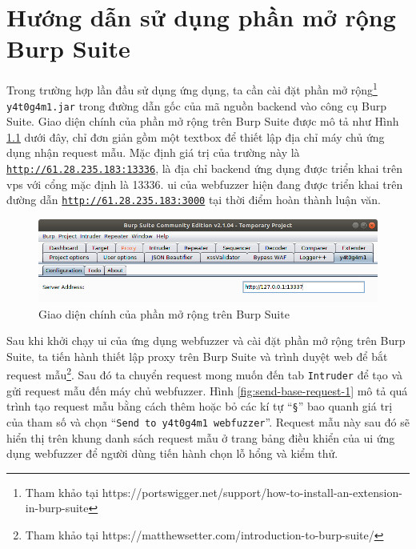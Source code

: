 \cleardoublepage
\appendix
\chapter{Hướng dẫn sử dụng phần mở rộng Burp Suite}
Trong trường hợp lần đầu sử dụng ứng dụng, ta cần cài đặt phần mở rộng\footnote{Tham khảo tại https://portswigger.net/support/how-to-install-an-extension-in-burp-suite} \texttt{y4t0g4m1.jar} trong đường dẫn gốc của mã nguồn backend vào công cụ Burp Suite. Giao diện chính của phần mở rộng trên Burp Suite được mô tả như Hình \ref{fig:main-burp-extension-interface} dưới đây, chỉ đơn giản gồm một textbox để thiết lập địa chỉ máy chủ ứng dụng nhận request mẫu. Mặc định giá trị của trường này là \href{http://61.28.235.183:13336}{\texttt{http://61.28.235.183:13336}}, là địa chỉ backend ứng dụng được triển khai trên \acrshort{vps} với cổng mặc định là 13336. \acrshort{ui} của webfuzzer hiện đang được triển khai trên đường dẫn \href{http://61.28.235.183:3000}{\texttt{http://61.28.235.183:3000}} tại thời điểm hoàn thành luận văn.
\begin{figure}[H]
  \centering
    \includegraphics[width=\textwidth,keepaspectratio=true]{images/main-burp-extension-interface.png}
  \caption{Giao diện chính của phần mở rộng trên Burp Suite}
  \label{fig:main-burp-extension-interface}
\end{figure}
Sau khi khởi chạy \acrshort{ui} của ứng dụng webfuzzer và cài đặt phần mở rộng trên Burp Suite, ta tiến hành thiết lập proxy trên Burp Suite và trình duyệt web để bắt request mẫu\footnote{Tham khảo tại https://matthewsetter.com/introduction-to-burp-suite/}. Sau đó ta chuyển request mong muốn đến tab \texttt{Intruder} để tạo và gửi request mẫu đến máy chủ webfuzzer. Hình \ref{fig:send-base-request-1} mô tả quá trình tạo request mẫu bằng cách thêm hoặc bỏ các kí tự ``\texttt{\S}'' bao quanh giá trị của tham số và chọn ``\texttt{Send to y4t0g4m1 webfuzzer}''. Request mẫu này sau đó sẽ hiển thị trên khung danh sách request mẫu ở trang bảng điều khiển của \acrshort{ui} ứng dụng webfuzzer để người dùng tiến hành chọn lỗ hổng và kiểm thử.